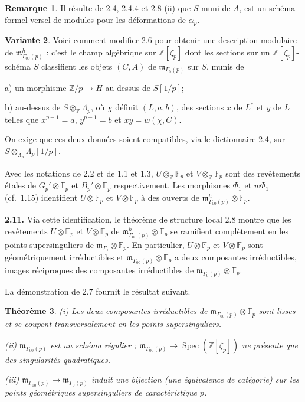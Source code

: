\documentclass[10pt,a4paper]{amsart}
\theoremstyle{plain}
\newtheorem{theorem}{Th\'eor\`eme}[section]
\theoremstyle{definition}
\newtheorem{remark}[theorem]{Remarque}
\newtheorem{variante}[theorem]{Variante}
\DeclareMathOperator{\Spec}{Spec}
\newcommand{\m}{\mathfrak{m}}
\newcommand{\FF}{\mathbb{F}}
\newcommand{\ZZ}{\mathbb{Z}}
\begin{document}
\begin{remark}
Il r\'esulte de 2.4, 2.4.4 et 2.8 (ii) que $S$ muni de $A$, est un sch\'ema formel versel de modules pour les d\'eformations de $\alpha_p$.
\end{remark}

\setcounter{theorem}{9}
\begin{variante}
Voici comment modifier 2.6 pour obtenir une description modulaire de $\m_{\Gamma_{00}(p)}^h$ : c'est le champ alg\'ebrique sur $\ZZ[\zeta_p]$ dont les sections sur un $\ZZ[\zeta_p]$-sch\'ema $S$ classifient les objets $(C,A)$ de $\m_{\Gamma_0(p)}$ sur $S$, munis de

a) un morphisme $\ZZ/p \to H$ au-dessus de $S[1/p]$;

b) au-dessus de $S \otimes_{\ZZ} \Lambda_p$, o\`u $\chi$ d\'efinit $(L,a,b)$, des sections $x$ de $L^*$ et $y$ de $L$ telles que $x^{p-1} = a$, $y^{p-1} = b$ et $xy = w(\chi,C)$.

On exige que ces deux donn\'ees soient compatibles, via le dictionnaire 2.4, sur $S \otimes_{\Lambda_p} \Lambda_p[1/p]$.
\end{variante}

Avec les notations de 2.2 et de 1.1 et 1.3, $U \otimes_{\ZZ} \FF_p$ et $V \otimes_{\ZZ} \FF_p$ sont des rev\^etements \'etales de $G_p' \otimes \FF_p$ et $B_p' \otimes \FF_p$ respectivement. Les morphismes $\Phi_1$ et $w\Phi_1$ (cf.\ 1.15) identifient $U \otimes \FF_p$ et $V \otimes \FF_p$ \`a des ouverts de $\m_{\Gamma_{00}(p)}^h \otimes \FF_p$.

\medskip\noindent\textbf{2.11.} Via cette identification, le th\'eor\`eme de structure local 2.8 montre que les rev\^etements $U \otimes \FF_p$ et $V \otimes \FF_p$ de $\m_{\Gamma_{00}(p)}^h \otimes \FF_p$ se ramifient compl\`etement en les points supersinguliers de $\m_{\Gamma_1} \otimes \FF_p$. En particulier, $U \otimes \FF_p$ et $V \otimes \FF_p$ sont g\'eom\'etriquement irr\'eductibles et $\m_{\Gamma_{00}(p)} \otimes \FF_p$ a deux composantes irr\'eductibles, images r\'eciproques des composantes irr\'eductibles de $\m_{\Gamma_0(p)} \otimes \FF_p$.

La d\'emonstration de 2.7 fournit le r\'esultat suivant.

\setcounter{theorem}{11}
\begin{theorem}
\emph{(i)} Les deux composantes irr\'eductibles de $\m_{\Gamma_{00}(p)} \otimes \FF_p$ sont lisses et se coupent transversalement en les points supersinguliers.

\emph{(ii)} $\m_{\Gamma_{00}(p)}$ est un sch\'ema r\'egulier ; $\m_{\Gamma_{00}(p)} \to \Spec(\ZZ[\zeta_p])$ ne pr\'esente que des singularit\'es quadratiques.

\emph{(iii)} $\m_{\Gamma_{00}(p)} \to \m_{\Gamma_0(p)}$ induit une bijection (une \'equivalence de cat\'egorie) sur les points g\'eom\'etriques supersinguliers de caract\'eristique $p$.
\end{theorem}
\end{document}

